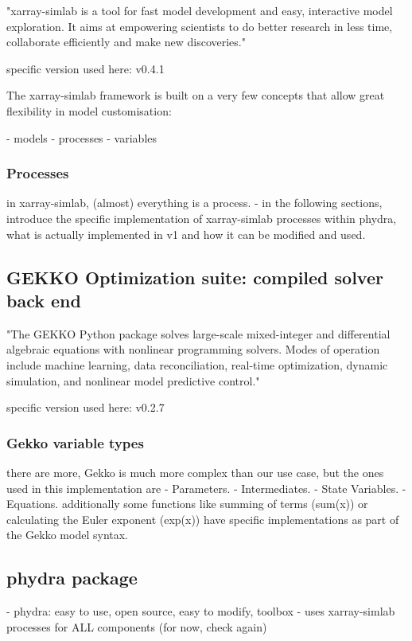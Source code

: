 \documentclass[template.tex]{subfiles}
\begin{document}
"xarray-simlab is a tool for fast model development and easy, interactive model exploration. It aims at empowering scientists to do better research in less time, collaborate efficiently and make new discoveries."

specific version used here: v0.4.1 \cite{benoit_bovy_2020_3755979}


The xarray-simlab framework is built on a very few concepts that allow great flexibility in model customisation:

- models
- processes
- variables

\subsubsection{Processes}
in xarray-simlab, (almost) everything is a process.
- in the following sections, introduce the specific implementation of xarray-simlab processes within phydra, what is actually implemented in v1 and how it can be modified and used.


\subsection{GEKKO Optimization suite: compiled solver back end}

"The GEKKO Python package solves large-scale mixed-integer and differential algebraic equations with nonlinear programming solvers. Modes of operation include machine learning, data reconciliation, real-time optimization, dynamic simulation, and nonlinear model predictive control." \cite{Beal2018GekkoSuite}

specific version used here: v0.2.7

\subsubsection{Gekko variable types}
there are more, Gekko is much more complex than our use case, but the ones used in this implementation are
- Parameters. 
- Intermediates. 
- State Variables.  
- Equations.
additionally some functions like summing of terms (sum(x)) or calculating the Euler exponent (exp(x)) have specific implementations as part of the Gekko model syntax.


\subsection{phydra package}
- phydra: easy to use, open source, easy to modify, toolbox
- uses xarray-simlab processes for ALL components (for now, check again)
\end{document}
